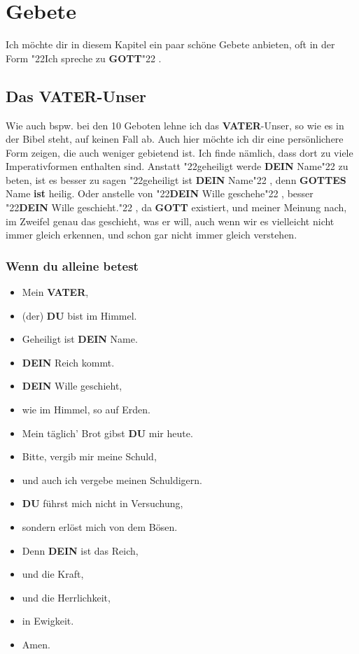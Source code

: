 \documentclass[12pt,a4paper]{article}
\newcommand{\Dein}[0]{\textbf{DEIN}}
\newcommand{\Du}[0]{\textbf{DU}}
\newcommand{\Gottes}[0]{\textbf{GOTTES}}
\newcommand{\Gott}[0]{\textbf{GOTT}}
\newcommand{\Vater}[0]{\textbf{VATER}}
\newcommand{\q}[1]{\char"22{#1}\char"22 }
\begin{document}
	\newpage
	\section{Gebete}
		Ich m\"ochte dir in diesem Kapitel ein paar sch\"one Gebete anbieten,
		oft in der Form \q{Ich spreche zu {\Gott}}.
	
	\subsection{Das {\Vater}-Unser}
		Wie auch bspw. bei den 10 Geboten lehne ich das {\Vater}-Unser,
		so wie es in der Bibel steht,
		auf keinen Fall ab.
		Auch hier m\"ochte ich dir eine pers\"onlichere Form zeigen,
		die auch weniger gebietend ist.
		Ich finde n\"amlich,
		dass dort zu viele Imperativformen enthalten sind.
		Anstatt \q{geheiligt werde {\Dein} Name} zu beten,
		ist es besser zu sagen \q{geheiligt ist {\Dein} Name},
		denn {\Gottes} Name \textbf{ist} heilig.
		Oder anstelle von \q{{\Dein} Wille geschehe},
		besser \q{{\Dein} Wille geschieht.},
		da {\Gott} existiert,
		und meiner Meinung nach,
		im Zweifel genau das geschieht,
		was er will,
		auch wenn wir es vielleicht nicht immer gleich erkennen,
		und schon gar nicht immer gleich verstehen.
	
	\subsubsection{Wenn du alleine betest}
		\begin{itemize}[nosep]
			\item[]	Mein {\Vater},
			\item[]	(der) {\Du} bist im Himmel.
			\item[]	Geheiligt ist {\Dein} Name.
			\item[]	{\Dein} Reich kommt.
			\item[]	{\Dein} Wille geschieht,
			\item[]	wie im Himmel,
					so auf Erden.
			\item[]	Mein t\"aglich' Brot gibst {\Du} mir heute.
			\item[]	Bitte,
					vergib mir meine Schuld,
			\item[]	und auch ich vergebe meinen Schuldigern.
			\item[]	{\Du} f\"uhrst mich nicht in Versuchung,
			\item[]	sondern erl\"ost mich von dem B\"osen.
			\item[]	Denn {\Dein} ist das Reich,
			\item[]	und die Kraft,
			\item[]	und die Herrlichkeit,
			\item[]	in Ewigkeit.
			\item[]	Amen.
		\end{itemize}
			
\end{document}
